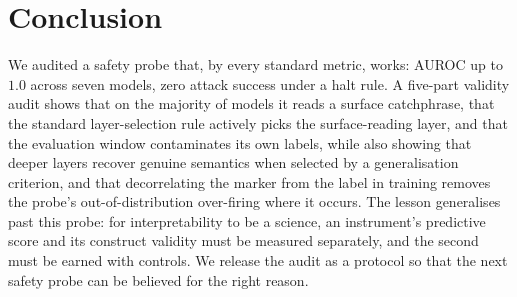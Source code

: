 \documentclass{article}
\begin{document}
\section{Conclusion}
\label{sec:conclusion}

We audited a safety probe that, by every standard metric, works: AUROC up to $1.0$ across seven models, zero attack success under a halt rule. A five-part validity audit shows that on the majority of models it reads a surface catchphrase, that the standard layer-selection rule actively picks the surface-reading layer, and that the evaluation window contaminates its own labels, while also showing that deeper layers recover genuine semantics when selected by a generalisation criterion, and that decorrelating the marker from the label in training removes the probe's out-of-distribution over-firing where it occurs. The lesson generalises past this probe: for interpretability to be a science, an instrument's predictive score and its construct validity must be measured separately, and the second must be earned with controls. We release the audit as a protocol so that the next safety probe can be believed for the right reason.



\end{document}
